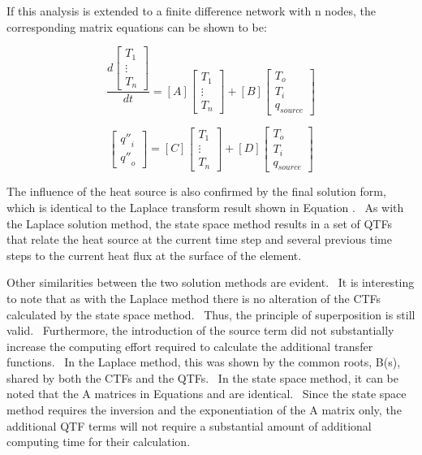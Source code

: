 If this analysis is extended to a finite difference network with n nodes, the corresponding matrix equations can be shown to be:

\begin{equation}
\frac{{d\left[ {\begin{array}{*{20}{c}}{{T_1}}\\ \vdots \\ {{T_n}}\end{array}} \right]}}{{dt}} = \left[ A \right]\left[ {\begin{array}{*{20}{c}}{{T_1}}\\ \vdots \\ {{T_n}}\end{array}} \right] + \left[ B \right]\left[ {\begin{array}{*{20}{c}}{{T_o}}\\ {{T_i}}\\ {{q_{source}}}\end{array}} \right]
\end{equation}

\begin{equation}
\left[ {\begin{array}{*{20}{c}}{{{q''}_i}}\\ {{{q''}_o}}\end{array}} \right] = \left[ C \right]\left[ {\begin{array}{*{20}{c}}{{T_1}}\\ \vdots \\ {{T_n}}\end{array}} \right] + \left[ D \right]\left[ {\begin{array}{*{20}{c}}{{T_o}}\\ {{T_i}}\\ {{q_{source}}}\end{array}} \right]
\end{equation}

The influence of the heat source is also confirmed by the final solution form, which is identical to the Laplace transform result shown in Equation .~ As with the Laplace solution method, the state space method results in a set of QTFs that relate the heat source at the current time step and several previous time steps to the current heat flux at the surface of the element.

Other similarities between the two solution methods are evident.~ It is interesting to note that as with the Laplace method there is no alteration of the CTFs calculated by the state space method.~ Thus, the principle of superposition is still valid.~ Furthermore, the introduction of the source term did not substantially increase the computing effort required to calculate the additional transfer functions.~ In the Laplace method, this was shown by the common roots, B(s), shared by both the CTFs and the QTFs.~ In the state space method, it can be noted that the A matrices in Equations and are identical.~ Since the state space method requires the inversion and the exponentiation of the A matrix only, the additional QTF terms will not require a substantial amount of additional computing time for their calculation.

